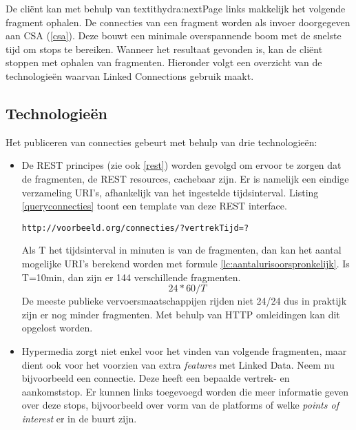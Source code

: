 De cli\"ent kan met behulp van textit{hydra:nextPage} links makkelijk het volgende fragment ophalen. De connecties van een fragment worden als invoer doorgegeven aan CSA (\ref{csa}). Deze bouwt een minimale overspannende boom met de snelste tijd om stops te bereiken. Wanneer het resultaat gevonden is, kan de cli\"ent stoppen met ophalen van fragmenten. Hieronder volgt een overzicht van de technologie\"en waarvan Linked Connections gebruik maakt.

\subsection{Technologie\"en}
Het publiceren van connecties gebeurt met behulp van drie technologie\"en: 
\begin{itemize}
\item De REST principes (zie ook \ref{rest}) worden gevolgd om ervoor te zorgen dat de fragmenten, de REST resources, cachebaar zijn. Er is namelijk een eindige verzameling URI's, afhankelijk van het ingestelde tijdsinterval. Listing \ref{queryconnecties} toont een template van deze REST interface.
\begin{lstlisting}[label=queryconnecties,caption=URI template van basis Linked Connections fragment.]
http://voorbeeld.org/connecties/?vertrekTijd=?
\end{lstlisting}
Als T het tijdsinterval in minuten is van de fragmenten, dan kan het aantal mogelijke URI's berekend worden met formule \ref{lc:aantalurisoorspronkelijk}. Is T=10min, dan zijn er 144 verschillende fragmenten.
\begin{equation} \label{lc:aantalurisoorspronkelijk}
24 * 60 / T
\end{equation}
De meeste publieke vervoersmaatschappijen rijden niet 24/24 dus in praktijk zijn er nog minder fragmenten. Met behulp van HTTP omleidingen kan dit opgelost worden.

\item Hypermedia zorgt niet enkel voor het vinden van volgende fragmenten, maar dient ook voor het voorzien van extra \textit{features} met Linked Data. Neem nu bijvoorbeeld een connectie. Deze heeft een bepaalde vertrek- en aankomststop. Er kunnen links toegevoegd worden die meer informatie geven over deze stops, bijvoorbeeld over vorm van de platforms of welke \textit{points of interest} er in de buurt zijn.


\end{itemize}
